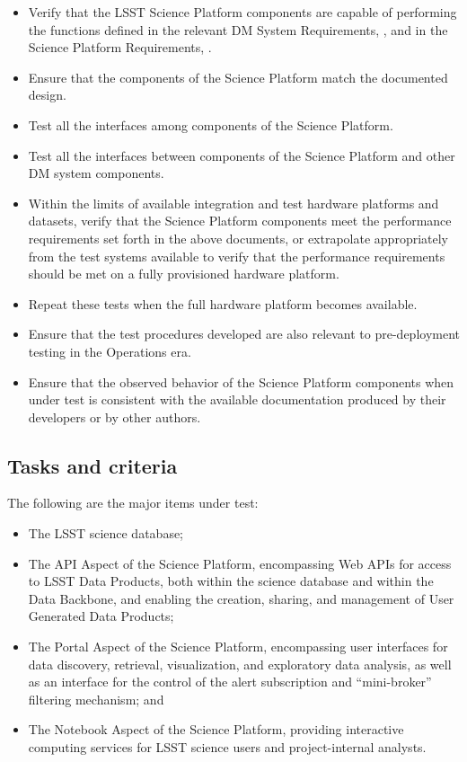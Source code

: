 \documentclass[DM,STS,toc]{lsstdoc}
\begin{document}
\begin{itemize}

\item{Verify that the LSST Science Platform components are capable of performing the functions defined in the relevant DM System Requirements, , and in the Science Platform Requirements, .}
\item{Ensure that the components of the Science Platform match the documented design.}
\item{Test all the interfaces among components of the Science Platform.}
\item{Test all the interfaces between components of the Science Platform and other DM system components.}
\item{Within the limits of available integration and test hardware platforms and datasets, verify that the Science Platform components meet the performance requirements set forth in the above documents, or extrapolate appropriately from the test systems available to verify that the performance requirements should be met on a fully provisioned hardware platform.}
\item{Repeat these tests when the full hardware platform becomes available.}
\item{Ensure that the test procedures developed are also relevant to pre-deployment testing in the Operations era.}
\item{Ensure that the observed behavior of the Science Platform components when under test is consistent with the available documentation produced by their developers or by other authors.}

\end{itemize}

\subsection{Tasks and criteria}
\label{sec:tasks}

The following are the major items under test:

\begin{itemize}

\item{The LSST science database;}
\item{The API Aspect of the Science Platform, encompassing Web APIs for access to LSST Data Products, both within the science database and within the Data Backbone, and enabling the creation, sharing, and management of User Generated Data Products;}
\item{The Portal Aspect of the Science Platform, encompassing user interfaces for data discovery, retrieval, visualization, and exploratory data analysis, as well as an interface for the control of the alert subscription and ``mini-broker'' filtering mechanism; and}
\item{The Notebook Aspect of the Science Platform, providing interactive computing services for LSST science users and project-internal analysts.}

\end{itemize}
\end{document}
